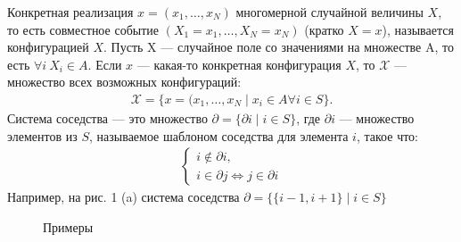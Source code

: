 \documentclass[12pt]{article}
\begin{document}
Конкретная реализация $x = (x_1, \ldots, x_N)$ многомерной случайной величины $X$, то есть совместное событие $(X_1 = x_1, \ldots, X_N = x_N)$ (кратко $X = x$), называется конфигурацией $X$. Пусть X --- случайное поле со значениями на множестве A, то есть $\forall i  \ X_i \in A$. Если $x$ --- какая-то конкретная конфигурация $X$, то $\mathcal{X}$ ---
множество всех возможных конфигураций:
\begin{gather*}
\mathcal{X} = \{ x = (x_1, \ldots, x_N \mid x_i \in A \forall i \in S\}.
\end{gather*}
Система соседства --- это множество $\partial = \{\partial i\mid i \in S \}$, где $\partial i$ --- множество элементов из $S $, называемое шаблоном соседства для элемента $i$, такое что:
\begin{gather*}
\begin{cases}
i \not \in \partial i, \\
i \in \partial j \Leftrightarrow j \in \partial i
\end{cases}
\end{gather*}
Например, на рис. 1 (a) система соседства $\partial = \{ \{i-1, i+1 \} \mid i \in S\}$
\begin{figure}[h!]
\centering
{}
\label{fig:mrf}
\caption{Примеры}
\end{figure}
\end{document}
